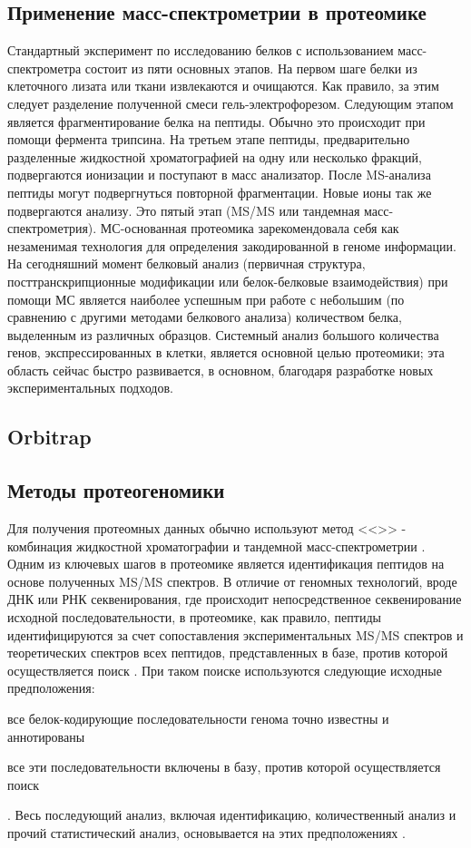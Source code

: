 \subsection{Применение масс-спектрометрии в протеомике}
Стандартный эксперимент по исследованию белков с использованием масс-спектрометра состоит из пяти основных этапов. На первом шаге белки из клеточного лизата или ткани извлекаются и очищаются. Как правило, за этим следует разделение полученной смеси гель-электрофорезом. Следующим этапом является фрагментирование белка на пептиды. Обычно это происходит при помощи фермента трипсина. На третьем этапе пептиды, предварительно разделенные жидкостной хроматографией на одну или несколько фракций, подвергаются ионизации и поступают в масс анализатор. После MS-анализа пептиды могут подвергнуться повторной фрагментации. Новые ионы так же подвергаются анализу. Это пятый этап (MS/MS или тандемная масс-спектрометрия). МС-основанная протеомика зарекомендовала себя как незаменимая технология для определения закодированной в геноме информации. На сегодняшний момент белковый анализ (первичная структура, посттранскрипционные модификации или белок-белковые взаимодействия) при помощи МС является наиболее успешным при работе с небольшим (по сравнению с другими методами белкового анализа) количеством белка, выделенным из различных образцов. Системный анализ большого количества генов, экспрессированных в клетки, является основной целью протеомики; эта область сейчас быстро развивается, в основном, благодаря разработке новых экспериментальных подходов.

\subsection{Orbitrap}

\subsection{Методы протеогеномики}
Для получения протеомных данных обычно используют метод <<>> - комбинация жидкостной хроматографии и тандемной масс-спектрометрии \cite{bantscheff2012quantitative}. Одним из ключевых шагов в протеомике является идентификация пептидов на основе полученных MS/MS спектров. В отличие от геномных технологий, вроде ДНК или РНК секвенирования, где происходит непосредственное секвенирование исходной последовательности, в протеомике, как правило, пептиды идентифицируются за счет сопоставления экспериментальных MS/MS спектров и теоретических спектров всех пептидов, представленных в базе, против которой осуществляется поиск \cite{nesvizhskii2010survey}.
При таком поиске используются следующие исходные предположения: 
\begin{inparaenum}
    \item все белок-кодирующие последовательности генома точно известны и аннотированы
    \item все эти последовательности включены в базу, против которой осуществляется поиск
\end{inparaenum}.
Весь последующий анализ, включая идентификацию, количественный анализ и прочий статистический анализ, основывается на этих предположениях \cite{nesvizhskii2005interpretation}.

